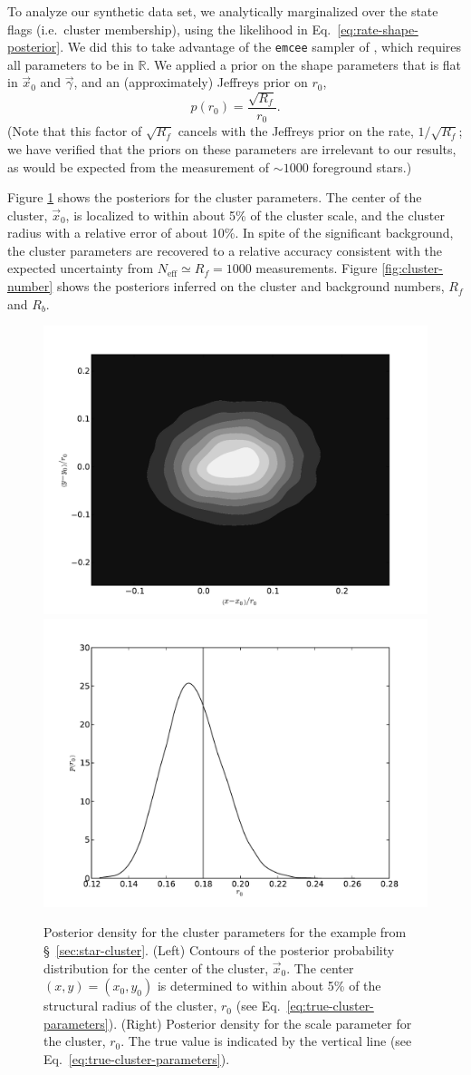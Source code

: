\documentclass[aps,prd,reprint,nofootinbib]{revtex4-1}
\begin{document}
To analyze our synthetic data set, we analytically marginalized over
the state flags (i.e.~cluster membership), using the likelihood in
Eq.~\eqref{eq:rate-shape-posterior}.  We did this to take advantage of
the \texttt{emcee} sampler of \citet{ForemanMackey2012}, which
requires all parameters to be in $\mathbb{R}$.  We applied a prior on
the shape parameters that is flat in $\vec{x}_0$ and $\vec{\gamma}$,
and an (approximately) Jeffreys prior on $r_0$,
\begin{equation}
  p\left( r_0 \right) = \frac{\sqrt{R_f}}{r_0}.
\end{equation}
(Note that this factor of $\sqrt{R_f}$ cancels with the Jeffreys prior
on the rate, $1/\sqrt{R_f}$; we have verified that the priors on these
parameters are irrelevant to our results, as would be expected from
the measurement of $\sim 1000$ foreground stars.)

Figure \ref{fig:cluster-params} shows the posteriors for the cluster
parameters.  The center of the cluster, $\vec{x}_0$, is localized to
within about 5\% of the cluster scale, and the cluster radius with a
relative error of about 10\%.  In spite of the significant background,
the cluster parameters are recovered to a relative accuracy consistent
with the expected uncertainty from $N_\mathrm{eff} \simeq R_f = 1000$
measurements.  Figure \ref{fig:cluster-number} shows the posteriors
inferred on the cluster and background numbers, $R_f$ and $R_b$.

\begin{figure}
  \includegraphics[width=0.4\columnwidth]{sky_location}\includegraphics[width=0.4\columnwidth]{scale}
  \caption{\label{fig:cluster-params} Posterior density for the
    cluster parameters for the example from \S~\ref{sec:star-cluster}.
    (Left) Contours of the posterior probability distribution for the
    center of the cluster, $\vec{x}_0$.  The center $(x,y) =
    \left(x_0, y_0\right)$ is determined to within about 5\% of the
    structural radius of the cluster, $r_0$ (see
    Eq.~\eqref{eq:true-cluster-parameters}).  (Right) Posterior
    density for the scale parameter for the cluster, $r_0$.  The true
    value is indicated by the vertical line (see
    Eq.~\ref{eq:true-cluster-parameters}).}
\end{figure}
\end{document}
